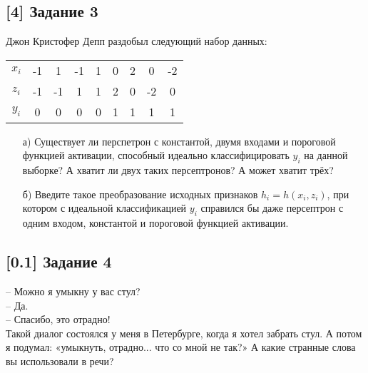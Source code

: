 \documentclass[12pt, a4paper, oneside]{article}
\begin{document}
\vspace{-0.5cm}
\subsection*{[4] Задание 3}
\vspace{-0.5cm}
Джон Кристофер Депп раздобыл следующий набор данных:
\begin{center}
    \begin{tabular}{ccccccccc}
        \toprule
        $x_i$ & -1 & 1 & -1 & 1 & 0 & 2 & 0 & -2\\ 
        $z_i$ & -1 & -1 & 1 & 1 & 2 & 0 & -2 & 0\\ 
        $y_i$ & 0 & 0 & 0 & 0 & 1 & 1 & 1 & 1\\
        \bottomrule
    \end{tabular}
\end{center}

\begin{enumerate}
    \item[а)] Существует ли перспетрон с константой, двумя входами и пороговой функцией активации, способный идеально классифицировать $y_i$ на данной выборке? А хватит ли двух таких персептронов? А может хватит трёх?
    \item[б)] Введите такое преобразование исходных признаков $h_i = h(x_i, z_i)$, при котором с идеальной классификацией $y_i$ справился бы даже персептрон с одним входом, константой и пороговой функцией активации.
\end{enumerate}

\vspace{-0.5cm}
\subsection*{[0.1] Задание 4} 
\vspace{-0.5cm} 
\noindent-- Можно я умыкну у вас стул?  \\
-- Да. \\ 
-- Спасибо, это отрадно! \\
Такой диалог состоялся у меня в Петербурге, когда я хотел забрать стул. А потом я подумал: «умыкнуть, отрадно... что со мной не так?» А какие странные слова вы использовали в речи? 
\end{document}
